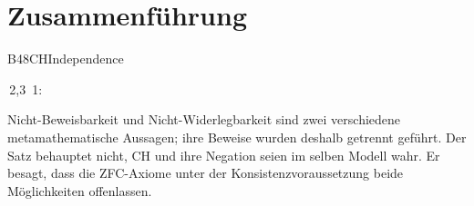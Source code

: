\section{Zusammenführung}

{B48CHIndependence}{
}
\begin{tabproof}
 {}
 {}
 {\,2,3}
 \proofstep{}{\begin{gathered}
   \BXLVIIICon(\BXLVIIIZFC)\longrightarrow\\
   ((\BXLVIIIZFC\nvdash\BXLVIIICH)\land
    (\BXLVIIIZFC\nvdash\neg\BXLVIIICH))
   \end{gathered}}
 {\,1\!:}
\end{tabproof}

\noindent
Nicht-Beweisbarkeit und Nicht-Widerlegbarkeit sind zwei verschiedene
metamathematische Aussagen; ihre Beweise wurden deshalb getrennt
geführt. Der Satz behauptet nicht, CH und ihre Negation seien im
selben Modell wahr. Er besagt, dass die ZFC-Axiome unter der
Konsistenzvoraussetzung beide Möglichkeiten offenlassen.
